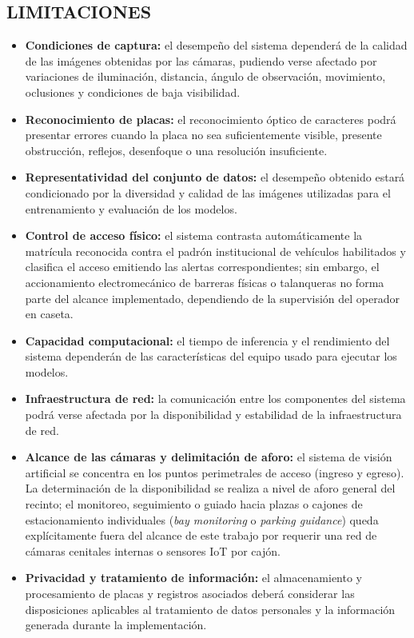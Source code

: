\subsection*{LIMITACIONES}

\begin{itemize}
    \item
        \textbf{Condiciones de captura:} el desempeño del sistema dependerá de la
        calidad de las imágenes obtenidas por las cámaras, pudiendo verse afectado
        por variaciones de iluminación, distancia, ángulo de observación, movimiento,
        oclusiones y condiciones de baja visibilidad.
    \item
        \textbf{Reconocimiento de placas:} el reconocimiento óptico de caracteres
        podrá presentar errores cuando la placa no sea suficientemente visible,
        presente obstrucción, reflejos, desenfoque o una resolución insuficiente.
    \item
        \textbf{Representatividad del conjunto de datos:} el desempeño obtenido
        estará condicionado por la diversidad y calidad de las imágenes utilizadas
        para el entrenamiento y evaluación de los modelos.
    \item
        \textbf{Control de acceso físico:} el sistema contrasta automáticamente
        la matrícula reconocida contra el padrón institucional de vehículos
        habilitados y clasifica el acceso emitiendo las alertas correspondientes;
        sin embargo, el accionamiento electromecánico de barreras físicas o
        talanqueras no forma parte del alcance implementado, dependiendo de la
        supervisión del operador en caseta.
    \item
        \textbf{Capacidad computacional:} el tiempo de inferencia y el rendimiento
        del sistema dependerán de las características del equipo usado para ejecutar
        los modelos.
    \item
        \textbf{Infraestructura de red:} la comunicación entre los componentes del
        sistema podrá verse afectada por la disponibilidad y estabilidad de la
        infraestructura de red.
    \item
        \textbf{Alcance de las cámaras y delimitación de aforo:} el sistema de
        visión artificial se concentra en los puntos perimetrales de acceso
        (ingreso y egreso). La determinación de la disponibilidad se realiza a
        nivel de aforo general del recinto; el monitoreo, seguimiento o guiado
        hacia plazas o cajones de estacionamiento individuales (\textit{bay monitoring}
        o \textit{parking guidance}) queda explícitamente fuera del alcance de este
        trabajo por requerir una red de cámaras cenitales internas o sensores IoT
        por cajón.
    \item
        \textbf{Privacidad y tratamiento de información:} el almacenamiento y
        procesamiento de placas y registros asociados deberá considerar las disposiciones
        aplicables al tratamiento de datos personales y la información generada durante
        la implementación.
\end{itemize}

